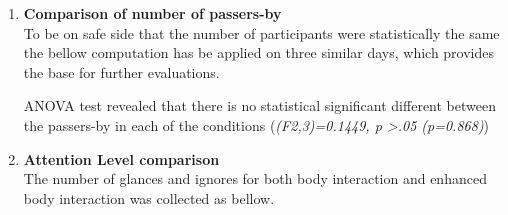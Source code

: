 \begin{enumerate}


\item \textbf{Comparison of number of passers-by} \\
To be on safe side that the number of participants were statistically the same the bellow computation has be applied on three similar days, which provides the base for further evaluations.

\begin{table}[H]
\caption{Number of people for three conditions}
\label{tab:newbodypasserbyofthreeweeks}
\centering
{}
\end{table}
ANOVA test revealed that there is no statistical significant different between the passers-by in each of the conditions (\emph{(F2,3)=0.1449, p >.05 (p=0.868)})



\item \textbf{Attention Level comparison}  \\
The number of glances and ignores for both body interaction and enhanced body interaction was collected as bellow.


\begin{table}[H]
\caption{Cross tabulation for each condition attention level}
\label{tab:newbodycrosstabulationweeks}
\centering
{}
\end{table}


\end{enumerate}
